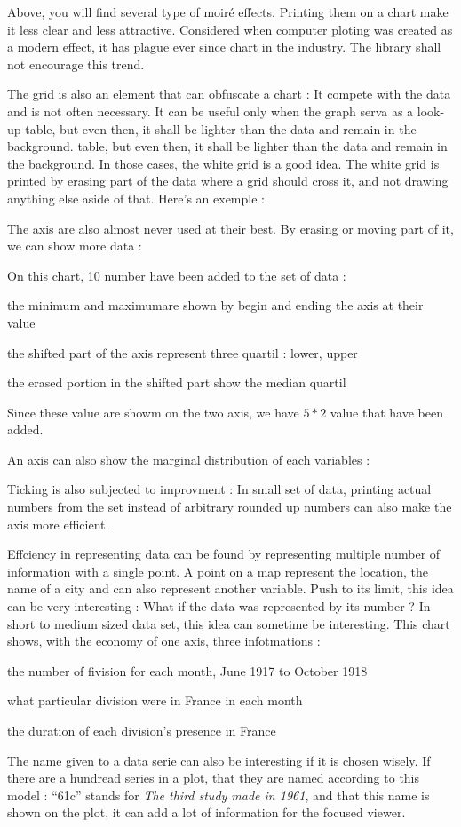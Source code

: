 Above, you will find several type of moiré effects. Printing them on a chart make it less clear and less attractive. Considered when computer ploting was created as a modern effect, it has plague ever since chart in the industry. The library shall not encourage this trend.

The grid is also an element that can obfuscate a chart : It compete with the data and is not often necessary.
 It can be useful only when the graph serva as a look-up table, but even then, it shall be lighter than the data and remain in the background. table, but even then, it shall be lighter than the data and remain in the background.
 In those cases, the white grid is a good idea. The white grid is printed by erasing part of the data where a grid should cross it, and not drawing anything else aside of that. Here's an exemple :

The axis are also almost never used at their best. By erasing or moving part of it, we can show more data : 


On this chart, 10 number have been added to the set of data : 
\begin{enum}
\item the minimum and maximumare shown by begin and ending the axis at their value
\item the shifted part of the axis represent three quartil : lower, upper
\item the erased portion in the shifted part show the median quartil
\end{enum}
Since these value are showm on the two axis, we have $5*2$ value that have been added.

An axis can also show the marginal distribution of each variables :

Ticking is also subjected to improvment : In small set of data, printing actual numbers from the set instead of arbitrary rounded up numbers can also make the axis more efficient.

Effciency in representing data can be found by representing multiple number of information with a single point. A point on a map represent the location, the name of a city and can also represent another variable.
 Push to its limit, this idea can be very interesting : What if the data was represented by its number ? In short to medium sized data set, this idea can sometime be interesting.
 This chart shows, with the economy of one axis, three infotmations : 
\begin{enum}
\item the number of fivision for each month, June 1917 to October 1918
\item what particular division were in France in each month
\item the duration of each division's presence in France
\end{enum}
The name given to a data serie can also be interesting if it is chosen wisely.
 If there are a hundread series in a plot, that they are named according to this model : ``61c'' stands for \emph{The third study made in 1961}, and that this name is shown on the plot, it can add a lot of information for the focused viewer.

